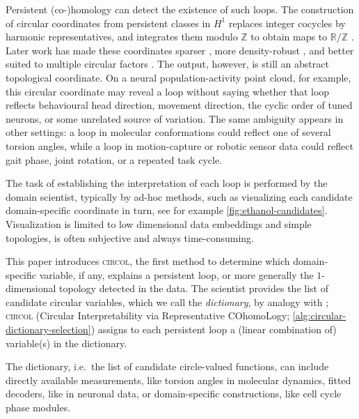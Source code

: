 \documentclass[a4paper,11pt, DIV=10]{scrartcl}
\numberwithin{equation}{section}
\theoremstyle{definition}
\theoremstyle{remark}
\newcommand{\Z}{\mathbb{Z}}
\newcommand{\R}{\mathbb{R}}
\begin{document}
Persistent (co-)homology can detect the existence of such loops.
The construction of circular coordinates from persistent
classes in $H^1$ replaces integer cocycles by harmonic representatives, and
integrates them modulo $\Z$ to obtain maps to
$\R/\Z$ \cite{DeSilva2009persistent}.
Later work has made these
coordinates sparser \cite{Perea2020}, more density-robust \cite{paik2023circular}, and better suited to
multiple circular
factors \cite{scoccola2023toroidal}.
The output, however, is still an abstract topological coordinate.  On
a neural population-activity point cloud, for example, this circular coordinate may reveal a
loop without saying whether that loop reflects behavioural head
direction, movement direction, the cyclic order of tuned neurons, or
some unrelated source of variation.  The same ambiguity appears in
other settings: a loop in molecular conformations could reflect one of
several torsion angles, while a loop in motion-capture or robotic
sensor data could reflect gait phase, joint rotation, or a repeated
task cycle.

The task of establishing the interpretation of each loop is performed by the domain scientist, typically by ad-hoc methods, such as visualizing each candidate domain-specific coordinate in turn, see for example \cref{fig:ethanol-candidates}.
Visualization is limited to low dimensional data embeddings and simple topologies, is often subjective and always time-consuming. 

This paper introduces \textsc{circol}, the first method to determine
which domain-specific variable, if any, explains a persistent loop, or
more generally the $1$-dimensional topology detected in the data.  The
scientist provides the list of candidate circular variables, which we
call the \emph{dictionary}, by analogy
with \cite{koelle2022manifold}; \textsc{circol} (Circular
Interpretability via Representative
COhomoLogy; \cref{alg:circular-dictionary-selection}) assigns to each persistent loop a (linear combination of) variable(s) in the dictionary.

The dictionary, i.e.\ the list of
candidate circle-valued functions, can include directly available measurements, like torsion angles in molecular dynamics,
fitted decoders, like in neuronal data, or domain-specific constructions, like cell cycle phase modules.
\end{document}
